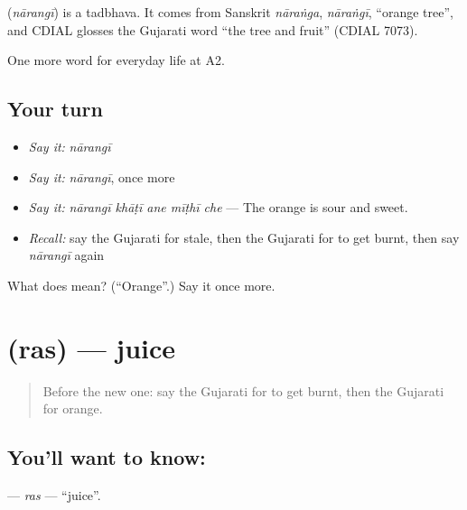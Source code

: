 \begin{cousinweb}
\textbf{} (\emph{nārangī}) is a tadbhava. It comes from Sanskrit \emph{nāraṅga}, \emph{nāraṅgī}, \textquotedblleft{}orange tree\textquotedblright{}, and CDIAL glosses the Gujarati word \textquotedblleft{}the tree and fruit\textquotedblright{} (CDIAL 7073).
\end{cousinweb}

\begin{grammarlens}[title={What you've built}]
One more word for everyday life at A2.
\end{grammarlens}

\subsection*{Your turn}
\begin{itemize}
\raggedright
  \item \emph{Say it:} \emph{nārangī}
  \item \emph{Say it:} \emph{nārangī}, once more
  \item \emph{Say it:} \emph{nārangī khāṭī ane mīṭhī che} — The orange is sour and sweet.
  \item \emph{Recall:} say the Gujarati for stale, then the Gujarati for to get burnt, then say \emph{nārangī} again
\end{itemize}

\begin{tcolorbox}[breakable,colback=teal!4,colframe=teal!35!black,title={Before you move on}]
What does  mean? (\textquotedblleft{}Orange\textquotedblright{}.) Say it once more.
\end{tcolorbox}
\section[\texorpdfstring{\gu{રસ} (ras)}{રસ (ras)}]{ (ras) — juice}

\label{lesson:GU-C172-ras}



\begin{quote}
Before the new one: say the Gujarati for to get burnt, then the Gujarati for orange.
\end{quote}

\subsection*{You'll want to know: }
\textbf{} — \emph{ras} — \textquotedblleft{}juice\textquotedblright{}.

